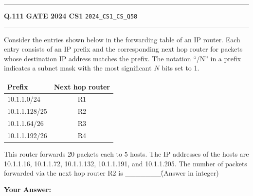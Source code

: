 \documentclass[a4paper,10pt]{article}
\begin{document}
\vspace{6pt}\hrule height 0.35pt\vspace{6pt}
\noindent
\begin{tcolorbox}[
    blanker,
    sidebyside,
    sidebyside align=top,
    lefthand width=0.55\textwidth,
    top=4pt, bottom=4pt, left=0pt, right=0pt,
    middle=16pt,
    underlay={
        \draw[dashed, black!80, line width=0.8pt, dash pattern=on 4pt off 3pt]
            ([xshift=0.55\textwidth+8pt]frame.north west) --
            ([xshift=0.55\textwidth+8pt]frame.south west);
    }
]
\textbf{Q.111}  \hfill {\footnotesize\textbf{GATE 2024 CS1} \quad \tiny\texttt{2024\_CS1\_CS\_Q58}}
\vspace{2pt}\hrule height 0.3pt\vspace{4pt}

Consider the entries shown below in the forwarding table of an IP router. Each entry consists of an IP prefix and the corresponding next hop router for packets whose destination IP address matches the prefix. The notation ``/N'' in a prefix indicates a subnet mask with the most significant $N$ bits set to 1.
\begin{center}
\begin{tabular}{|l|c|}
\hline
\textbf{Prefix} & \textbf{Next hop router} \\
\hline
10.1.1.0/24 & R1 \\
10.1.1.128/25 & R2 \\
10.1.1.64/26 & R3 \\
10.1.1.192/26 & R4 \\
\hline
\end{tabular}
\end{center}
This router forwards 20 packets each to 5 hosts. The IP addresses of the hosts are 10.1.1.16, 10.1.1.72, 10.1.1.132, 10.1.1.191, and 10.1.1.205. The number of packets forwarded via the next hop router R2 is \_\_\_\_\_\_\_\. (Answer in integer)

\par\vspace{6pt}\noindent\textbf{Your Answer:} \fbox{\rule{0pt}{1.3ex}\hspace{3cm}}

\tcblower


\end{tcolorbox}
\end{document}
